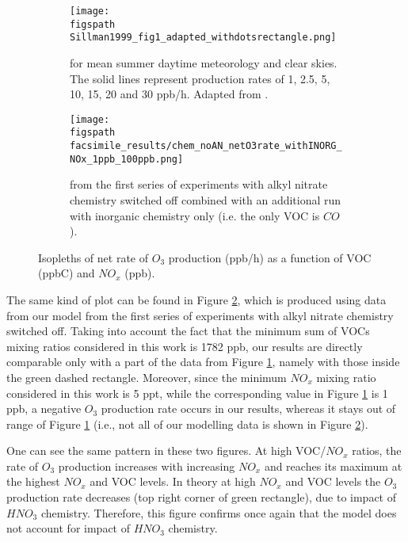 \documentclass[11pt,a4paper]{article}
\newcommand{\figspath}{figures/}
\begin{document}
\begin{figure}[t!]
	\centering
    \begin{subfigure}[t]{0.45\linewidth}
        \centering
        \texttt{[image: \\figspath Sillman1999\_fig1\_adapted\_withdotsrectangle.png]}
        \caption{for mean summer daytime meteorology and clear skies. The solid lines represent production rates of 1, 2.5, 5, 10, 15, 20 and 30 ppb/h. Adapted from \citep{Sillman1999}.}
        \label{fig:Sillman1999}
    \end{subfigure}%
    \hfill
    \begin{subfigure}[t]{0.5\linewidth}
        \centering
        \texttt{[image: \\figspath facsimile\_results/chem\_noAN\_netO3rate\_withINORG\_NOx\_1ppb\_100ppb.png]}
        \caption{from the first series of experiments with alkyl nitrate chemistry switched off combined with an additional run with inorganic chemistry only (i.e. the only VOC is $CO$).}
        \label{fig:noAN_netO3rate}
    \end{subfigure}
    \caption{Isopleths of net rate of $O_3$ production (ppb/h) as a function of VOC (ppbC) and $NO_x$ (ppb).}
    \label{fig:netO3rate}
\end{figure}

The same kind of plot can be found in Figure \ref{fig:noAN_netO3rate}, which is produced using data from our model from the first series of experiments with alkyl nitrate chemistry switched off. Taking into account the fact that the minimum sum of VOCs mixing ratios considered in this work is 1782 ppb, our results are directly comparable only with a part of the data from Figure \ref{fig:Sillman1999}, namely with those inside the green dashed rectangle. Moreover, since the minimum $NO_x$ mixing ratio considered in this work is 5 ppt, while the corresponding value in Figure \ref{fig:Sillman1999} is 1 ppb, a negative $O_3$ production rate occurs in our results, whereas it stays out of range of Figure \ref{fig:Sillman1999} (i.e., not all of our modelling data is shown in Figure \ref{fig:noAN_netO3rate}).

One can see the same pattern in these two figures. At high VOC/$NO_x$ ratios, the rate of $O_3$ production increases with increasing $NO_x$ and reaches its maximum at the highest $NO_x$ and VOC levels. In theory at high $NO_x$ and VOC levels the $O_3$ production rate decreases (top right corner of green rectangle), due to impact of $HNO_3$ chemistry. Therefore, this figure confirms once again that the model does not account for impact of $HNO_3$ chemistry.
\end{document}

